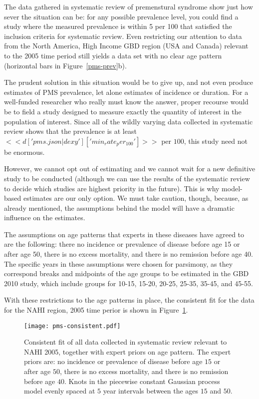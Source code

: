 The data gathered in systematic review of premenstural syndrome show
just how sever the situation can be: for any possible prevalence
level, you could find a study where the measured prevalence is within
5 per 100 that satisfied the inclusion criteria for systematic review.
Even restricting our attention to data from the North America, High
Income GBD region (USA and Canada) relevant to the 2005 time period
still yields a data set with no clear age pattern (horizontal bars in
Figure~\ref{pms-prev}b).

The prudent solution in this situation would be to give up, and not
even produce estimates of PMS prevalence, let alone estimates of incidence or
duration.  For a well-funded researcher who really must know the
answer, proper recourse would be to field a study designed to measure
exactly the quantity of interest in the population of
interest.  Since all of the wildly varying data collected in
systematic review shows that the prevalence is at least
$<<d['pms.json|dexy']['min_rate_per_100']>>$ per $100$, this study
need not be enormous.

However, we cannot opt out of estimating and we cannot wait for a new
definitive study to be conducted (although we can use the results of
the systematic review to decide which studies are highest priority in
the future).  This is why model-based estimates are our only option.
We must take caution, though, because, as already mentioned, the
assumptions behind the model will have a dramatic influence on the
estimates.

The assumptions on age patterns that experts in these diseases have
agreed to are the following: there no incidence or prevalence of
disease before age 15 or after age 50, there is no excess mortality,
and there is no remission before age 40.  The specific years in these
assumptions were chosen for parsimony, as they correspond breaks and
midpoints of the age groups to be estimated in the GBD 2010 study,
which include groups for 10-15, 15-20, 20-25, 25-35, 35-45, and 45-55.

With these restrictions to the age patterns in place, the consistent
fit for the data for the NAHI region, 2005 time perior is shown in
Figure~\ref{pms-consistent}.
\begin{figure}
\begin{center}
\texttt{[image: pms-consistent.pdf]}
\end{center}
\caption{Consistent fit of all data collected in systematic
  review relevant to NAHI 2005, together with expert priors on age pattern.  The expert
  priors are: no incidence or prevalence of disease before age $15$ or
  after age $50$, there is no excess mortality, and there is no
  remission before age $40$.  Knots in the piecewise constant Gaussian
  process model evenly spaced at $5$ year intervals between the ages $15$ and $50$.}
\label{pms-consistent}
\end{figure}

